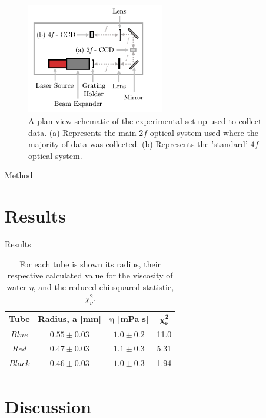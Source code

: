 \documentclass[twocolumn]{revtex4}
\begin{document}
\begin{figure}[!h]
\begin{center}
\includegraphics[width=6cm]{method/fig1}
\caption[]{A plan view schematic of the experimental set-up used to collect data. (a) Represents the main $2f$ optical system used where the majority of data was collected. (b) Represents the 'standard' $4f$ optical system.  }
\label{fig:fig1}
\end{center}
\end{figure}

Method

\vspace{-3ex}
\section{Results}
\vspace{-2ex}

Results

\begin{table}[h!]
\centering
\begin{tabular}{c@{\hskip 20pt}c@{\hskip 20pt}c@{\hskip 20pt}c} 
 \hline
 \textbf{Tube} & \textbf{Radius, a [mm]} & \textbf{$\boldsymbol{\eta}$ [mPa {s}]} & \textbf{$\boldsymbol{\chi^2_{\nu}}$} \\ [0.5ex] 
 $Blue$ &$0.55\pm0.03$ & $1.0\pm0.2$ & 11.0 \\ 
 $Red$ & $0.47\pm0.03$ & $1.1\pm0.3$ & 5.31 \\
 $Black$ & $0.46\pm0.03$ & $1.0\pm0.3$ & 1.94 \\
 
 \hline
\end{tabular}
\caption{For each tube is shown its radius, their respective calculated value for the viscosity of water $\eta$, and the reduced chi-squared statistic, $\chi^2_{\nu}$.}
\label{table:1}
\end{table}

\vspace{-3ex}
\section{Discussion}
\vspace{-2ex}
\end{document}
